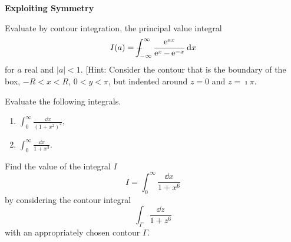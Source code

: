 {\begin{Exercise}
\end{Exercise}





\begin{large}
  \noindent
  \textbf{Exploiting Symmetry}
\end{large}






\begin{Exercise}
  \label{exercise e ax / (e x - e -x)}
  Evaluate by contour integration, the principal value integral
  \[
  I(a) = - \negthickspace \negthickspace \negthickspace \negmedspace\int_{-\infty}^\infty \frac{ \mathop{\mathrm{e}}\nolimits^{a x} }{ \mathop{\mathrm{e}}\nolimits^x - \mathop{\mathrm{e}}\nolimits^{-x} } \,\mathrm{d} x
  \]
  for $a$ real and $|a| < 1$.  
  [Hint: Consider the contour that is the boundary of the box,
  $-R < x < R$, $0 < y < \pi$,
  but indented around $z = 0$ and $z = \imath \pi$.

\end{Exercise}







\begin{Exercise}
  \label{exercise 1/(x^3+1)}
  Evaluate the following integrals.
  \begin{enumerate}
  \item
    $\displaystyle \int_0^\infty \frac{\dd x}{(1 + x^2)^2}$, 
  \item
    $\displaystyle \int_0^\infty \frac{\dd x}{1 + x^3}$.
  \end{enumerate}

\end{Exercise}






\begin{Exercise}
  \label{exercise 1/(1+x^6)}
  Find the value of the integral $I$
  \[
  I = \int_0^\infty \frac{\dd x}{1 + x^6}
  \]
  by considering the contour integral
  \[
  \int_\Gamma \frac{\dd z}{1 + z^6}
  \]
  with an appropriately chosen contour $\Gamma$.

\end{Exercise}








}
